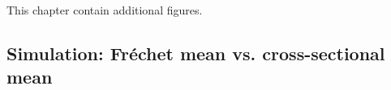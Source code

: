 This chapter contain additional figures.

\subsection{Simulation: Fréchet mean vs. cross-sectional mean}
\label{sec:sim_figures}



